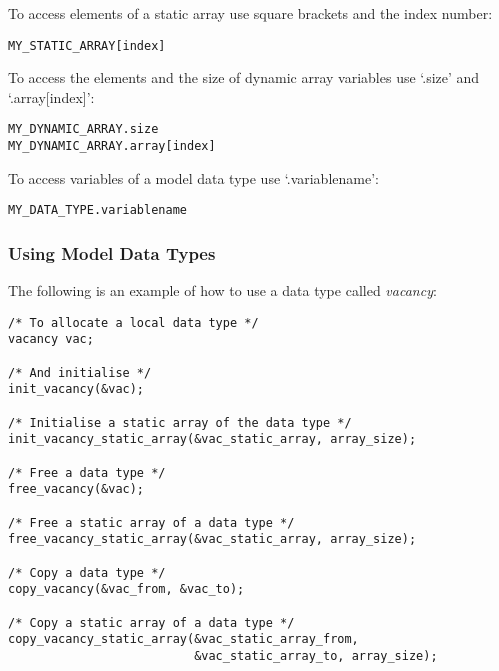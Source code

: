 To access elements of a static array use square brackets and the index number:

\begin{mylisting}
\begin{verbatim}
MY_STATIC_ARRAY[index]
\end{verbatim}
\end{mylisting}

To access the elements and the size of dynamic array variables use
`.size' and `.array[index]':

\begin{mylisting}
\begin{verbatim}
MY_DYNAMIC_ARRAY.size
MY_DYNAMIC_ARRAY.array[index]
\end{verbatim}
\end{mylisting}

To access variables of a model data type use `.variablename':

\begin{mylisting}
\begin{verbatim}
MY_DATA_TYPE.variablename
\end{verbatim}
\end{mylisting}

\subsubsection{Using Model Data Types}

The following is an example of how to use a data type called
\emph{vacancy}:

\begin{mylisting}
\begin{verbatim}
/* To allocate a local data type */
vacancy vac;

/* And initialise */
init_vacancy(&vac);

/* Initialise a static array of the data type */
init_vacancy_static_array(&vac_static_array, array_size);

/* Free a data type */
free_vacancy(&vac);

/* Free a static array of a data type */
free_vacancy_static_array(&vac_static_array, array_size);

/* Copy a data type */
copy_vacancy(&vac_from, &vac_to);

/* Copy a static array of a data type */
copy_vacancy_static_array(&vac_static_array_from,
                          &vac_static_array_to, array_size);
\end{verbatim}
\end{mylisting}

